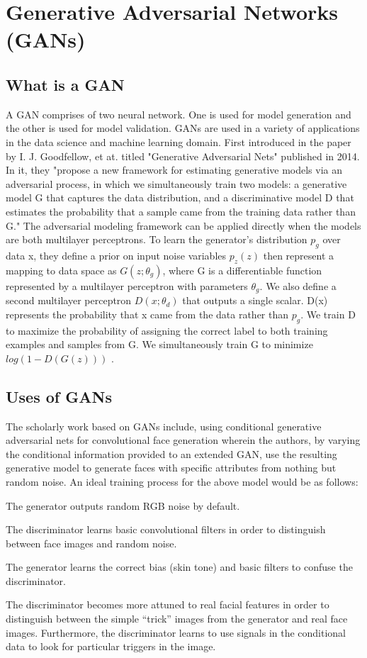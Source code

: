 \documentclass[conference, onecolumn, a4, 12pt]{IEEEtran}
\begin{document}
\section{Generative Adversarial Networks (GANs)}
\subsection{What is a GAN}

A GAN comprises of two neural network. One is used for model generation and the other is used for model validation. GANs are used in a variety of applications in the data science and machine learning domain. First introduced in the paper by I. J. Goodfellow, et at. titled "Generative Adversarial Nets" published in 2014. In it, they "propose a new framework for estimating generative models via an adversarial
process, in which we simultaneously train two models: a generative model G
that captures the data distribution, and a discriminative model D that estimates
the probability that a sample came from the training data rather than G." The adversarial modeling framework can be applied directly when the models are both multilayer perceptrons. To learn the generator’s distribution $p_{g}$ over data x, they define a prior on input noise variables $p_{z}(z)$ then represent a mapping to data space as $G(z; \theta_{g})$, where G is a differentiable function represented by a multilayer perceptron with parameters $\theta_{g}$. We also define a second multilayer perceptron $D(x; θ_{d})$ that outputs a single scalar. D(x) represents the probability that x came from the data rather than $p_{g}$. We train D to maximize the probability of assigning the correct label to both training examples and samples from G. We simultaneously train G to minimize $log(1-D(G(z)))$ \cite{b1}.

\subsection{Uses of GANs}

The scholarly work based on GANs include, using conditional generative adversarial nets for convolutional face generation wherein the authors, by varying the conditional information provided to an extended GAN, use the resulting generative model
to generate faces with specific attributes from nothing but random noise. An ideal training process for the above model would be
as follows: 
\begin{list}{*}{spacing}
	\item The generator outputs random RGB noise by default.
	\item The discriminator learns basic convolutional filters in
	order to distinguish between face images and random
	noise.
	\item The generator learns the correct bias (skin tone) and
	basic filters to confuse the discriminator.
	\item  The discriminator becomes more attuned to real facial
	features in order to distinguish between the simple
	“trick” images from the generator and real face images.
	Furthermore, the discriminator learns to use signals in
	the conditional data to look for particular triggers in
	the image.
\end{list} 
\end{document}
